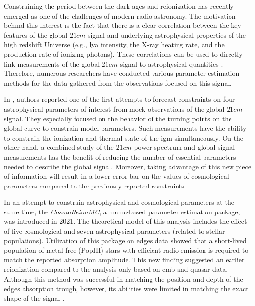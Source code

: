 \documentclass[%
 reprint,
 amsmath,amssymb,
 aps,
]{revtex4-2}
\begin{document}
Constraining the period between the dark ages and reionization has recently emerged as one of the challenges of modern radio astronomy. The motivation behind this interest is the fact that there is a clear correlation between the key features of the global $21cm$ signal and underlying astrophysical properties of the high redshift Universe (e.g., \gls{lya} intensity, the X-ray heating rate, and the production rate of ionizing photons). These correlations can be used to directly link measurements of the global $21cm$ signal to astrophysical quantities \cite{chart_param_space}.
Therefore, numerous researchers have conducted various parameter estimation methods for the data gathered from the observations focused on this signal.\par

In \cite{pe_galaxy_formation}, authors reported one of the first attempts to forecast constraints on four astrophysical parameters of interest from mock observations of the global $21cm$ signal. They especially focused on the behavior of the turning points on the global curve to constrain model parameters. Such measurements have the ability to constrain the ionization and thermal state of the \gls{igm} simultaneously. On the other hand, a combined study of the $21cm$ power spectrum and global signal measurements has the benefit of reducing the number of essential parameters needed to describe the global signal. Moreover, taking advantage of this new piece of information will result in a lower error bar on the values of cosmological parameters compared to the previously reported constraints \cite{21cmpower_global_comnbine}. \par

In an attempt to constrain astrophysical and cosmological parameters at the same time, the \emph{CosmoReionMC}, a \gls{mcmc}-based parameter estimation package, was introduced in 2021. The theoretical model of this analysis includes the effect of five cosmological and seven astrophysical parameters (related to stellar populations). Utilization of this package on \gls{edges} data showed that a short-lived population of metal-free (PopIII) stars with efficient radio emission is required to match the reported absorption amplitude. This new finding suggested an earlier reionization compared to the analysis only based on \gls{cmb} and quasar data. Although this method was successful in matching the position and depth of the \gls{edges} absorption trough, however, its abilities were limited in matching the exact shape of the signal \cite{pe_mcmc_1}.\par
\end{document}
